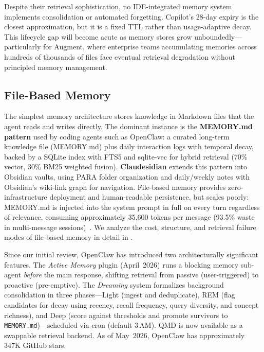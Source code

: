 Despite their retrieval sophistication, no IDE-integrated memory system
implements consolidation or automated forgetting.  Copilot's 28-day
expiry is the closest approximation, but it is a fixed TTL rather than
usage-adaptive decay.  This lifecycle gap will become acute as memory
stores grow unboundedly---particularly for Augment, where enterprise
teams accumulating memories across hundreds of thousands of files face
eventual retrieval degradation without principled memory management.

\subsection{File-Based Memory}
\label{sec:filebased}

The simplest memory architecture stores knowledge in Markdown files
that the agent reads and writes directly. The dominant instance is the
\textbf{MEMORY.md pattern} used by coding agents such as OpenClaw:
a curated long-term knowledge file (MEMORY.md) plus daily interaction
logs with temporal decay, backed by a SQLite index with FTS5 and
sqlite-vec for hybrid retrieval (70\% vector, 30\% BM25 weighted
fusion). \textbf{Claudesidian} extends this pattern into Obsidian
vaults, using PARA folder organization and daily/weekly notes with
Obsidian's wiki-link graph for navigation. File-based memory provides
zero-infrastructure deployment and human-readable persistence, but
scales poorly: MEMORY.md is injected into the system prompt in full
on every turn regardless of relevance, consuming approximately 35,600
tokens per message (93.5\% waste in multi-message
sessions)~\cite{openclaw9157}. We analyze the cost, structure, and
retrieval failure modes of file-based memory in detail in
.

Since our initial review, OpenClaw has introduced two architecturally
significant features. The \emph{Active Memory} plugin (April~2026)
runs a blocking memory sub-agent \emph{before} the main response,
shifting retrieval from passive (user-triggered) to proactive
(pre-emptive). The \emph{Dreaming} system formalizes background
consolidation in three phases---Light (ingest and deduplicate), REM
(flag candidates for decay using recency, recall frequency, query
diversity, and concept richness), and Deep (score against thresholds
and promote survivors to \texttt{MEMORY.md})---scheduled via cron
(default 3\,AM). QMD is now available as a swappable retrieval
backend. As of May~2026, OpenClaw has approximately 347K GitHub stars.

